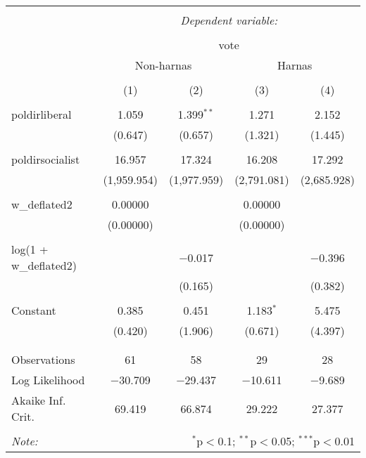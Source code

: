 
\begin{table}[!htbp] \centering 
  \caption{} 
  \label{} 
\begin{tabular}{@{\extracolsep{5pt}}lcccc} 
\\[-1.8ex]\hline 
\hline \\[-1.8ex] 
 & \multicolumn{4}{c}{\textit{Dependent variable:}} \\ 
\cline{2-5} 
\\[-1.8ex] & \multicolumn{4}{c}{vote} \\ 
 & \multicolumn{2}{c}{Non-harnas} & \multicolumn{2}{c}{Harnas} \\ 
\\[-1.8ex] & (1) & (2) & (3) & (4)\\ 
\hline \\[-1.8ex] 
 poldirliberal & 1.059 & 1.399$^{**}$ & 1.271 & 2.152 \\ 
  & (0.647) & (0.657) & (1.321) & (1.445) \\ 
  & & & & \\ 
 poldirsocialist & 16.957 & 17.324 & 16.208 & 17.292 \\ 
  & (1,959.954) & (1,977.959) & (2,791.081) & (2,685.928) \\ 
  & & & & \\ 
 w\_deflated2 & 0.00000 &  & 0.00000 &  \\ 
  & (0.00000) &  & (0.00000) &  \\ 
  & & & & \\ 
 log(1 + w\_deflated2) &  & $-$0.017 &  & $-$0.396 \\ 
  &  & (0.165) &  & (0.382) \\ 
  & & & & \\ 
 Constant & 0.385 & 0.451 & 1.183$^{*}$ & 5.475 \\ 
  & (0.420) & (1.906) & (0.671) & (4.397) \\ 
  & & & & \\ 
\hline \\[-1.8ex] 
Observations & 61 & 58 & 29 & 28 \\ 
Log Likelihood & $-$30.709 & $-$29.437 & $-$10.611 & $-$9.689 \\ 
Akaike Inf. Crit. & 69.419 & 66.874 & 29.222 & 27.377 \\ 
\hline 
\hline \\[-1.8ex] 
\textit{Note:}  & \multicolumn{4}{r}{$^{*}$p$<$0.1; $^{**}$p$<$0.05; $^{***}$p$<$0.01} \\ 
\end{tabular} 
\end{table} 
